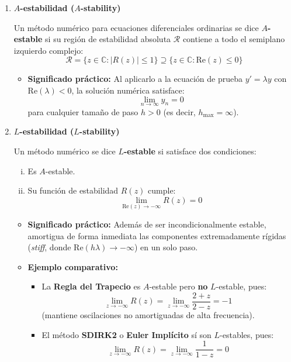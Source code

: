 \begin{enumerate}[\bfseries 1.]
    \item \textbf{$A$-estabilidad ($A$-stability)}
    
    Un método numérico para ecuaciones diferenciales ordinarias se dice \textbf{$A$-estable} si su región de estabilidad absoluta $\mathcal{R}$ contiene a todo el semiplano izquierdo complejo:
    \[
    \mathcal{R} = \{ z \in \mathbb{C} : |R(z)| \le 1 \} \supseteq \{ z \in \mathbb{C} : \text{Re}(z) \le 0 \}
    \]
    
    \begin{itemize}
        \item \textbf{Significado práctico:} Al aplicarlo a la ecuación de prueba $y' = \lambda y$ con $\text{Re}(\lambda) < 0$, la solución numérica satisface:
        \[
        \lim_{n \to \infty} y_n = 0
        \]
        para cualquier tamaño de paso $h > 0$ (es decir, $h_{\max} = \infty$).
    \end{itemize}

    \vspace{0.5cm}

    \item \textbf{$L$-estabilidad ($L$-stability)}
    
    Un método numérico se dice \textbf{$L$-estable} si satisface dos condiciones:
    \begin{enumerate}[i)]
        \item Es $A$-estable.
        \item Su función de estabilidad $R(z)$ cumple:
        \[
        \lim_{\text{Re}(z) \to -\infty} R(z) = 0
        \]
    \end{enumerate}

    \begin{itemize}
        \item \textbf{Significado práctico:} Además de ser incondicionalmente estable, amortigua de forma inmediata las componentes extremadamente rígidas (\textit{stiff}, donde $\text{Re}(h\lambda) \to -\infty$) en un solo paso.
        \item \textbf{Ejemplo comparativo:}
        \begin{itemize}
            \item La \textbf{Regla del Trapecio} es $A$-estable pero \textbf{no} $L$-estable, pues:
            \[
            \lim_{z \to -\infty} R(z) = \lim_{z \to -\infty} \frac{2+z}{2-z} = -1
            \]
            (mantiene oscilaciones no amortiguadas de alta frecuencia).
            \item El método \textbf{SDIRK2} o \textbf{Euler Implícito} sí son $L$-estables, pues:
            \[
            \lim_{z \to -\infty} R(z) = \lim_{z \to -\infty} \frac{1}{1-z} = 0
            \]
        \end{itemize}
    \end{itemize}
\end{enumerate}
